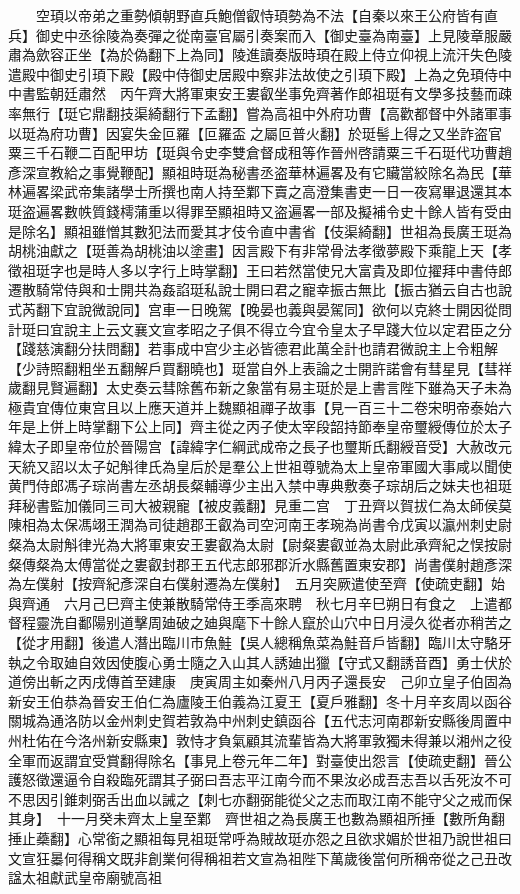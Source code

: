 　　空頊以帝弟之重勢傾朝野直兵鮑僧叡恃頊勢為不法【自秦以來王公府皆有直兵】御史中丞徐陵為奏彈之從南臺官屬引奏案而入【御史臺為南臺】上見陵章服嚴肅為歛容正坐【為於偽翻下上為同】陵進讀奏版時頊在殿上侍立仰視上流汗失色陵遣殿中御史引頊下殿【殿中侍御史居殿中察非法故使之引頊下殿】上為之免頊侍中中書監朝廷肅然　丙午齊大將軍東安王婁叡坐事免齊著作郎祖珽有文學多技藝而疎率無行【珽它鼎翻技渠綺翻行下孟翻】嘗為高祖中外府功曹【高歡都督中外諸軍事以珽為府功曹】因宴失金叵羅【叵羅盃之屬叵普火翻】於珽髻上得之又坐詐盗官粟三千石鞭二百配甲坊【珽與令史李雙倉督成租等作晉州啓請粟三千石珽代功曹趙彥深宣教給之事覺鞭配】顯祖時珽為秘書丞盗華林遍畧及有它贜當絞除名為民【華林遍畧梁武帝集諸學士所撰也南人持至鄴下賣之高澄集書吏一日一夜寫畢退還其本珽盗遍畧數帙質錢樗蒲重以得罪至顯祖時又盗遍畧一部及擬補令史十餘人皆有受由是除名】顯祖雖憎其數犯法而愛其才伎令直中書省【伎渠綺翻】世祖為長廣王珽為胡桃油獻之【珽善為胡桃油以塗畫】因言殿下有非常骨法孝徵夢殿下乘龍上天【孝徵祖珽字也是時人多以字行上時掌翻】王曰若然當使兄大富貴及即位擢拜中書侍郎遷散騎常侍與和士開共為姦諂珽私說士開曰君之寵幸振古無比【振古猶云自古也說式芮翻下宜說微說同】宫車一日晚駕【晚晏也義與晏駕同】欲何以克終士開因從問計珽曰宜說主上云文襄文宣孝昭之子俱不得立今宜令皇太子早踐大位以定君臣之分【踐慈演翻分扶問翻】若事成中宫少主必皆德君此萬全計也請君微說主上令粗解【少詩照翻粗坐五翻解戶買翻曉也】珽當自外上表論之士開許諾會有彗星見【彗祥歲翻見賢遍翻】太史奏云彗除舊布新之象當有易主珽於是上書言陛下雖為天子未為極貴宜傳位東宫且以上應天道并上魏顯祖禪子故事【見一百三十二卷宋明帝泰始六年是上併上時掌翻下公上同】齊主從之丙子使太宰段韶持節奉皇帝璽綬傳位於太子緯太子即皇帝位於晉陽宫【諱緯字仁綱武成帝之長子也璽斯氏翻綬音受】大赦改元天統又詔以太子妃斛律氏為皇后於是羣公上世祖尊號為太上皇帝軍國大事咸以聞使黄門侍郎馮子琮尚書左丞胡長粲輔導少主出入禁中專典敷奏子琮胡后之妹夫也祖珽拜秘書監加儀同三司大被親寵【被皮義翻】見重二宫　丁丑齊以賀拔仁為太師侯莫陳相為太保馮翊王潤為司徒趙郡王叡為司空河南王孝琬為尚書令戊寅以瀛州刺史尉粲為太尉斛律光為大將軍東安王婁叡為太尉【尉粲婁叡並為太尉此承齊紀之悮按尉粲傳粲為太傅當從之婁叡封郡王五代志郎邪郡沂水縣舊置東安郡】尚書僕射趙彥深為左僕射【按齊紀彥深自右僕射遷為左僕射】　五月突厥遣使至齊【使疏吏翻】始與齊通　六月己巳齊主使兼散騎常侍王季高來聘　秋七月辛巳朔日有食之　上遣都督程靈洗自鄱陽别道擊周廸破之廸與麾下十餘人竄於山穴中日月浸久從者亦稍苦之【從才用翻】後遣人潛出臨川市魚鮭【吳人總稱魚菜為鮭音戶皆翻】臨川太守駱牙執之令取廸自效因使腹心勇士隨之入山其人誘廸出獵【守式又翻誘音酉】勇士伏於道傍出斬之丙戌傳首至建康　庚寅周主如秦州八月丙子還長安　己卯立皇子伯固為新安王伯恭為晉安王伯仁為廬陵王伯義為江夏王【夏戶雅翻】冬十月辛亥周以函谷關城為通洛防以金州刺史賀若敦為中州刺史鎮函谷【五代志河南郡新安縣後周置中州杜佑在今洛州新安縣東】敦恃才負氣顧其流輩皆為大將軍敦獨未得兼以湘州之役全軍而返謂宜受賞翻得除名【事見上卷元年二年】對臺使出怨言【使疏吏翻】晉公護怒徵還逼令自殺臨死謂其子弼曰吾志平江南今而不果汝必成吾志吾以舌死汝不可不思因引錐刺弼舌出血以誡之【刺七亦翻弼能從父之志而取江南不能守父之戒而保其身】　十一月癸未齊太上皇至鄴　齊世祖之為長廣王也數為顯祖所捶【數所角翻捶止蘃翻】心常銜之顯祖每見祖珽常呼為賊故珽亦怨之且欲求媚於世祖乃說世祖曰文宣狂㬥何得稱文既非創業何得稱祖若文宣為祖陛下萬歲後當何所稱帝從之己丑改諡太祖獻武皇帝廟號高祖